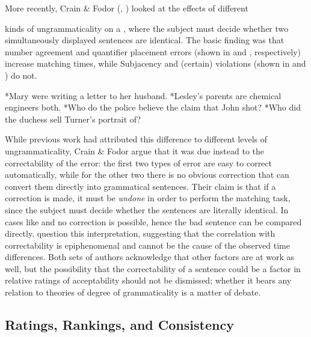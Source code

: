 More recently, Crain \& Fodor (\citeyear{CrainFodor1985}, \citeyear{CrainEtAl1987}) looked at the effects of different

kinds of ungrammaticality on a , where the subject
must decide whether two simultaneously displayed sentences are identical. The basic finding was that number agreement and quantifier placement errors (shown in  and , respectively) increase matching times, while Subjacency and (certain)  violations (shown in  and ) do not.

\ea \label{ex:3:9}
*Mary were writing a letter to her husband.
\z
\ea\label{ex:3:10}
 *Lesley's parents are chemical engineers both.
\z
\ea\label{ex:3:11}
 *Who do the police believe the claim that John shot?
\z
\ea\label{ex:3:12}
 *Who did the duchess sell Turner's portrait of?
\z


While previous work had attributed this difference to different levels of ungrammaticality, Crain \& Fodor argue that it was due instead to the correctability of the error: the first two types of error are easy to correct automatically, while for the other two there is no obvious correction that can convert them directly into grammatical sentences. Their claim is that if a correction is made, it must be \textit{undone} in order to perform the matching task, since the subject must decide whether the sentences are literally identical. In cases like  and  no correction is possible, hence the bad sentence can be compared directly. \citet{ForsterEtAl1987} question this interpretation, suggesting that the correlation with correctability is epiphenomenal and cannot be the cause of the observed time differences. Both sets of authors acknowledge that other factors are at work as well, but the possibility that the correctability of a sentence could be a factor in relative ratings of acceptability should not be dismissed; whether it bears any relation to theories of degree of grammaticality is a matter of debate.

\subsection{Ratings, Rankings, and Consistency} \label{sec:3.3.4}

